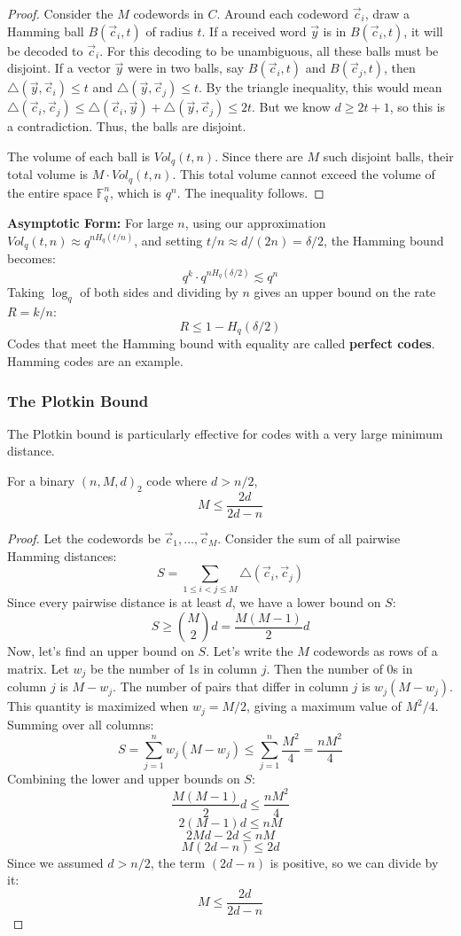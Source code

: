 \begin{proof}
Consider the $M$ codewords in $C$. Around each codeword $\vec{c}_i$, draw a Hamming ball $B(\vec{c}_i, t)$ of radius $t$.
If a received word $\vec{y}$ is in $B(\vec{c}_i, t)$, it will be decoded to $\vec{c}_i$. For this decoding to be unambiguous, all these balls must be disjoint. If a vector $\vec{y}$ were in two balls, say $B(\vec{c}_i, t)$ and $B(\vec{c}_j, t)$, then $\triangle(\vec{y}, \vec{c}_i) \le t$ and $\triangle(\vec{y}, \vec{c}_j) \le t$. By the triangle inequality, this would mean $\triangle(\vec{c}_i, \vec{c}_j) \le \triangle(\vec{c}_i, \vec{y}) + \triangle(\vec{y}, \vec{c}_j) \le 2t$. But we know $d \ge 2t+1$, so this is a contradiction. Thus, the balls are disjoint.

The volume of each ball is $Vol_q(t, n)$. Since there are $M$ such disjoint balls, their total volume is $M \cdot Vol_q(t, n)$. This total volume cannot exceed the volume of the entire space $\mathbb{F}_q^n$, which is $q^n$. The inequality follows.
\end{proof}

\textbf{Asymptotic Form:} For large $n$, using our approximation $Vol_q(t, n) \approx q^{n H_q(t/n)}$, and setting $t/n \approx d/(2n) = \delta/2$, the Hamming bound becomes:
\[ q^k \cdot q^{n H_q(\delta/2)} \lesssim q^n \]
Taking $\log_q$ of both sides and dividing by $n$ gives an upper bound on the rate $R = k/n$:
\[ R \le 1 - H_q(\delta/2) \]
Codes that meet the Hamming bound with equality are called \textbf{perfect codes}. Hamming codes are an example.

\subsubsection{The Plotkin Bound}

The Plotkin bound is particularly effective for codes with a very large minimum distance.

\begin{theorem}
For a binary $(n, M, d)_2$ code where $d > n/2$,
\[ M \le \frac{2d}{2d - n} \]
\end{theorem}

\begin{proof}
Let the codewords be $\vec{c}_1, \dots, \vec{c}_M$. Consider the sum of all pairwise Hamming distances:
\[ S = \sum_{1 \le i < j \le M} \triangle(\vec{c}_i, \vec{c}_j) \]
Since every pairwise distance is at least $d$, we have a lower bound on $S$:
\[ S \ge \binom{M}{2} d = \frac{M(M-1)}{2} d \]
Now, let's find an upper bound on $S$. Let's write the $M$ codewords as rows of a matrix. Let $w_j$ be the number of 1s in column $j$. Then the number of 0s in column $j$ is $M-w_j$. The number of pairs that differ in column $j$ is $w_j(M-w_j)$. This quantity is maximized when $w_j = M/2$, giving a maximum value of $M^2/4$.
Summing over all columns:
\[ S = \sum_{j=1}^n w_j(M-w_j) \le \sum_{j=1}^n \frac{M^2}{4} = \frac{nM^2}{4} \]
Combining the lower and upper bounds on $S$:
\[ \frac{M(M-1)}{2} d \le \frac{nM^2}{4} \]
\[ 2(M-1)d \le nM \]
\[ 2Md - 2d \le nM \]
\[ M(2d - n) \le 2d \]
Since we assumed $d > n/2$, the term $(2d-n)$ is positive, so we can divide by it:
\[ M \le \frac{2d}{2d - n} \]
\end{proof}

